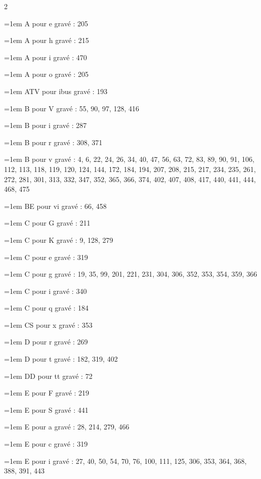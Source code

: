 \begin{multicols}{2}\footnotesize\setlength{\parindent}{0pt}\raggedright
\hangindent=1em A pour e gravé : 205\par
\hangindent=1em A pour h gravé : 215\par
\hangindent=1em A pour i gravé : 470\par
\hangindent=1em A pour o gravé : 205\par
\hangindent=1em ATV pour ibus gravé : 193\par
\hangindent=1em B pour V gravé : 55, 90, 97, 128, 416\par
\hangindent=1em B pour i gravé : 287\par
\hangindent=1em B pour r gravé : 308, 371\par
\hangindent=1em B pour v gravé : 4, 6, 22, 24, 26, 34, 40, 47, 56, 63, 72, 83, 89, 90, 91, 106, 112, 113, 118, 119, 120, 124, 144, 172, 184, 194, 207, 208, 215, 217, 234, 235, 261, 272, 281, 301, 313, 332, 347, 352, 365, 366, 374, 402, 407, 408, 417, 440, 441, 444, 468, 475\par
\hangindent=1em BE pour vi gravé : 66, 458\par
\hangindent=1em C pour G gravé : 211\par
\hangindent=1em C pour K gravé : 9, 128, 279\par
\hangindent=1em C pour e gravé : 319\par
\hangindent=1em C pour g gravé : 19, 35, 99, 201, 221, 231, 304, 306, 352, 353, 354, 359, 366\par
\hangindent=1em C pour i gravé : 340\par
\hangindent=1em C pour q gravé : 184\par
\hangindent=1em CS pour x gravé : 353\par
\hangindent=1em D pour r gravé : 269\par
\hangindent=1em D pour t gravé : 182, 319, 402\par
\hangindent=1em DD pour tt gravé : 72\par
\hangindent=1em E pour F gravé : 219\par
\hangindent=1em E pour S gravé : 441\par
\hangindent=1em E pour a gravé : 28, 214, 279, 466\par
\hangindent=1em E pour c gravé : 319\par
\hangindent=1em E pour i gravé : 27, 40, 50, 54, 70, 76, 100, 111, 125, 306, 353, 364, 368, 388, 391, 443\par

\end{multicols}
